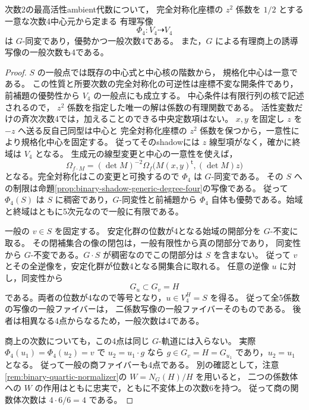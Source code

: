 \begin{proposition}
\label{prop:binary-shadow-full-five-coefficients}
次数2の最高活性ambient代数について，
完全対称化座標の $z^2$ 係数を $1/2$ とする一意な次数4中心元から定まる
有理写像
\[
                 \Phi_4:V_4\dashrightarrow V_4
\]
は $G$-同変であり，優勢かつ一般次数4である。
また，$G$ による有理商上の誘導写像の一般次数も4である。
\end{proposition}
\begin{proof}
$S$ の一般点では既存の中心式と中心核の階数から，
規格化中心は一意である。
この性質と所要次数の完全対称化の可逆性は座標不変な開条件であり，
前補題の優勢性から $V_4$ の一般点にも成立する。
中心条件は有限行列の核で記述されるので，
$z^2$ 係数を指定した唯一の解は係数の有理関数である。
活性変数だけの斉次次数4では，加えることのできる中央定数項はない。
$x,y$ を固定し $z$ を $-z$ へ送る反自己同型は中心と
完全対称化座標の $z^2$ 係数を保つから，一意性により規格化中心を固定する。
従ってそのshadowには $z$ 線型項がなく，確かに終域は $V_4$ となる。
生成元の線型変更と中心の一意性を使えば，
\[
 \Omega_{f\cdot M}
   =(\det M)^{-2}
       \Omega_f\bigl(M(x,y)^{\mathsf t},(\det M)z\bigr)
\]
となる。完全対称化はこの変更と可換するので $\Phi_4$ は $G$-同変である。
その $S$ への制限は命題\ref{prop:binary-shadow-generic-degree-four}の写像である。
従って $\Phi_4(S)$ は $S$ に稠密であり，$G$-同変性と前補題から
$\Phi_4$ 自体も優勢である。始域と終域はともに5次元なので一般に有限である。

一般の $v\in S$ を固定する。
安定化群の位数が4となる始域の開部分を $G$-不変に取る。
その閉補集合の像の閉包は，一般有限性から真の閉部分であり，
同変性から $G$-不変である。$G\cdot S$ が稠密なのでこの閉部分は $S$ を含まない。
従って $v$ とその全逆像を，安定化群が位数4となる開集合に取れる。
任意の逆像 $u$ に対し，同変性から
\[
                     G_u\subset G_v=H
\]
である。両者の位数が4なので等号となり，$u\in V_4^H=S$ を得る。
従って全5係数の写像の一般ファイバーは，
二係数写像の一般ファイバーそのものである。
後者は相異なる4点からなるため，一般次数は4である。

商上の次数についても，この4点は同じ $G$-軌道には入らない。
実際 $\Phi_4(u_1)=\Phi_4(u_2)=v$ で $u_2=u_1\cdot g$ なら
$g\in G_v=H=G_{u_1}$ であり，$u_2=u_1$ となる。
従って一般の商ファイバーも4点である。
別の確認として，注意\ref{rem:binary-quartic-normalizer}の
$W=N_G(H)/H$ を用いると，
二つの係数体への $W$ の作用はともに忠実で，ともに不変体上の次数6を持つ。
従って商の関数体次数は $4\cdot6/6=4$ である。
\end{proof}

